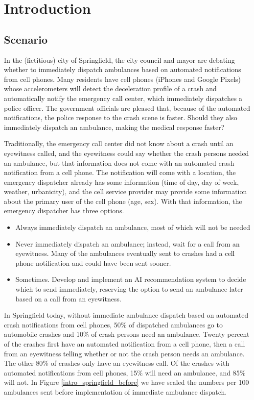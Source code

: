 \section{Introduction}
\label{intro}

\subsection{Scenario}
\label{intro_scenario}

In the (fictitious) city of Springfield, the city council and mayor are debating whether to immediately dispatch ambulances based on automated notifications from cell phones.  Many residents have cell phones (iPhones and Google Pixels) whose accelerometers will detect the deceleration profile of a crash and automatically notify the emergency call center, which immediately dispatches a police officer.  The government officials are pleased that, because of the automated notifications, the police response to the crash scene is faster.  Should they also immediately dispatch an ambulance, making the medical response faster?

Traditionally, the emergency call center did not know about a crash until an eyewitness called, and the eyewitness could say whether the crash persons needed an ambulance, but that information does not come with an automated crash notification from a cell phone. The notification will come with a location, the emergency dispatcher already has some information (time of day, day of week, weather, urbanicity), and the cell service provider may provide some information about the primary user of the cell phone (age, sex).  With that information, the emergency dispatcher has three options.

\begin{itemize}
	\item Always immediately dispatch an ambulance, most of which will not be needed
	\item Never immediately dispatch an ambulance; instead, wait for a call from an eyewitness.  Many of the ambulances eventually sent to crashes had a cell phone notification and could have been sent sooner.  
	\item Sometimes.  Develop and implement an AI recommendation system to decide which to send immediately, reserving the option to send an ambulance later based on a call from an eyewitness.  
\end{itemize}


In Springfield today, without immediate ambulance dispatch based on automated crash notifications from cell phones, 50\% of dispatched ambulances go to automobile crashes and 10\% of crash persons need an ambulance.  Twenty percent of the crashes first have an automated notification from a cell phone, then a call from an eyewitness telling whether or not the crash person needs an ambulance.  The other 80\% of crashes only have an eyewitness call.  Of the crashes with automated notifications from cell phones, 15\% will need an ambulance, 
and 85\% will not. 
In Figure \ref{intro_springfield_before} we have scaled the numbers per 100 ambulances sent before implementation of immediate ambulance dispatch.  


